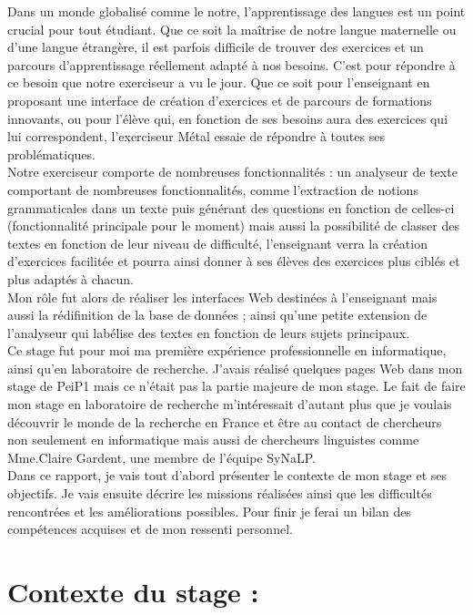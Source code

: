 \documentclass[12pt]{article}
\begin{document}
Dans un monde globalisé comme le notre, l’apprentissage des langues est un point crucial pour tout étudiant. Que ce soit la maîtrise de notre langue maternelle ou d’une langue étrangère, il est parfois difficile de trouver des exercices et un parcours d’apprentissage réellement adapté à nos besoins. C’est pour répondre à ce besoin que notre exerciseur a vu le jour. Que ce soit pour l’enseignant en proposant une interface de création d’exercices et de parcours de formations innovants, ou pour l’élève qui, en fonction de ses besoins aura des exercices qui lui correspondent, l’exerciseur Métal essaie de répondre à toutes ses problématiques.  \\
Notre exerciseur comporte de nombreuses fonctionnalités : un analyseur de texte comportant de nombreuses fonctionnalités, comme l'extraction de notions grammaticales dans un texte puis générant des questions en fonction de celles-ci (fonctionnalité principale pour le moment) mais aussi la possibilité de classer des textes en fonction de leur niveau de difficulté, l'enseignant verra la création d'exercices facilitée et pourra ainsi donner à ses élèves des exercices plus ciblés et plus adaptés à chacun. \\
Mon rôle fut alors de réaliser les interfaces Web destinées à l'enseignant mais aussi la rédifinition de la base de données ; ainsi qu'une petite extension de l'analyseur qui labélise des textes en fonction de leurs sujets principaux. \\
Ce stage fut pour moi ma première expérience professionnelle en informatique, ainsi qu’en laboratoire de recherche. J’avais réalisé quelques pages Web dans mon stage de PeiP1 mais ce n’était pas la partie majeure de mon stage. Le fait de faire mon stage en laboratoire de recherche m'intéressait d’autant plus que je voulais découvrir le monde de la recherche en France et être au contact de chercheurs non seulement en informatique mais aussi de chercheurs linguistes comme Mme.Claire Gardent, une membre de l’équipe SyNaLP. \\
Dans ce rapport, je vais tout d’abord présenter le contexte de mon stage et ses objectifs. Je vais ensuite décrire les missions réalisées ainsi que les difficultés rencontrées et les améliorations possibles. Pour finir je ferai un bilan des compétences acquises et de mon ressenti personnel. 

\newpage 

\section{Contexte du stage :}
\end{document}
